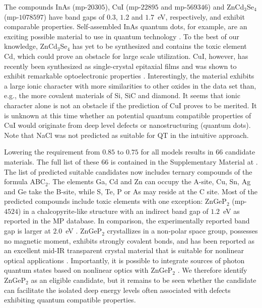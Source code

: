 \documentclass[superscriptaddress,unsortedaddress,
 amsmath,amssymb,
 aps,
]{revtex4-2}
\begin{document}
The compounds InAs (mp-$20305$), CuI (mp-$22895$ and mp-$569346$) and ZnCd$_3$Se$_4$ (mp-$1078597$) have band gaps of $0.3$, $1.2$ and $1.7$~eV, respectively, and exhibit comparable properties. Self-assembled InAs quantum dots, for example, are an exciting possible material to use in quantum technology \cite{Liu2018}. To the best of our knowledge, ZnCd$_3$Se$_4$ has yet to be synthesized and contains the toxic element Cd, which could prove an obstacle for large scale utilization. CuI, however, has recently been synthesized as single-crystal epitaxial films and was shown to exhibit remarkable optoelectronic properties \cite{Ahn2020}.  Interestingly, the material exhibits a large ionic character with more similarities to other oxides in the data set than, e.g., the more covalent materials of Si, SiC and  diamond.  
It seems that ionic character alone is not an obstacle if the prediction of CuI proves to be merited. It is unknown at this time whether an potential quantum compatible properties of CuI would originate from deep level defects or nanostructuring (quantum dots).  
Note that NaCl was not predicted as suitable for QT in the intuitive approach. 

Lowering the requirement from $0.85$ to $0.75$ for all models results in $66$ candidate materials. 
The full list of these $66$ is contained in the Supplementary Material at \cite{supplementary}. 
The list of predicted suitable candidates now includes ternary compounds of the formula ABC$_2$. The elements Ga, Cd and Zn can occupy the A-site, Cu, Sn, Ag and Ge take the B-site, while S, Te, P or As may reside at the C site. Most of the predicted compounds include toxic elements with one exception: ZnGeP$_2$ (mp-$4524$) in a chalcopyrite-like structure with an indirect band gap of $1.2$~eV \cite{Zhang2015} as reported in the MP database. In comparison, the experimentally reported band gap is larger at $2.0$~eV \cite{Xing1989}. 
ZnGeP$_2$ crystallizes in a non-polar space group, possesses no magnetic moment, exhibits strongly covalent bonds, and has been reported as an excellent mid-IR transparent crystal material that is suitable for nonlinear optical applications \cite{Zhang2015}.  Importantly, it is possible to integrate sources of photon quantum states based on nonlinear optics with ZnGeP$_2$  \cite{Caspani2017}. 
We therefore identify ZnGeP$_2$ as an eligible candidate, but it remains to be seen whether the candidate can facilitate the isolated deep energy levels often associated with defects exhibiting quantum compatible properties. 
\end{document}
